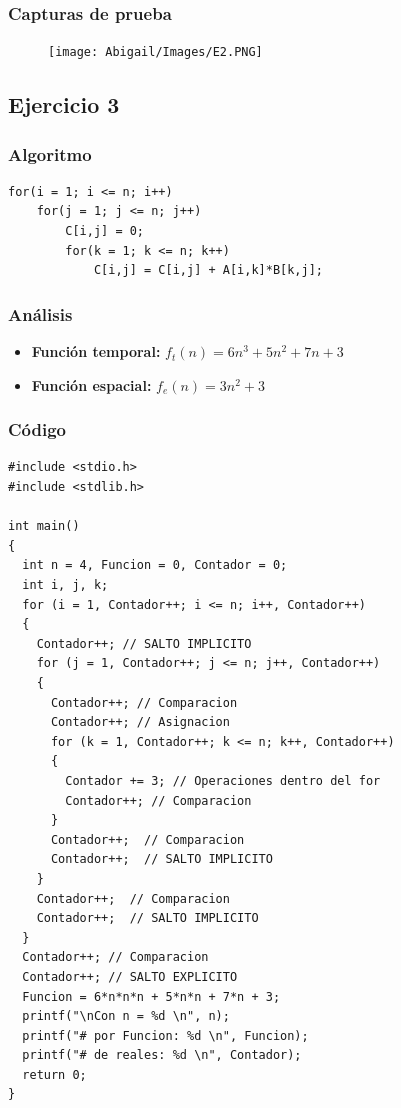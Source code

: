 \documentclass[12pt]{article}
\begin{document}
    		\subsubsection{Capturas de prueba}
				\begin{figure}[h!]
	                \centering
	                \texttt{[image: Abigail/Images/E2.PNG]}
	 		    \end{figure} 
    		

	    \subsection{Ejercicio 3}
	    	\subsubsection{Algoritmo}
	        \begin{lstlisting}[style=Java]
for(i = 1; i <= n; i++)
	for(j = 1; j <= n; j++)
		C[i,j] = 0;
		for(k = 1; k <= n; k++)
			C[i,j] = C[i,j] + A[i,k]*B[k,j]; 
    		\end{lstlisting}
    		\subsubsection{Análisis}
    			\begin{itemize}
    				\item[\Checkmark] \textbf{Función temporal:} $f_{t}(n) = 6n^{3} + 5n^{2} + 7n + 3 $
    				\item[\Checkmark] \textbf{Función espacial:} $f_{e}(n) = 3n^{2} + 3$
    			\end{itemize}
    		\subsubsection{Código}
    		\begin{lstlisting}[style=Java]
#include <stdio.h>
#include <stdlib.h>

int main() 
{
  int n = 4, Funcion = 0, Contador = 0;
  int i, j, k;
  for (i = 1, Contador++; i <= n; i++, Contador++) 
  {
    Contador++; // SALTO IMPLICITO
    for (j = 1, Contador++; j <= n; j++, Contador++) 
    {
      Contador++; // Comparacion
      Contador++; // Asignacion
      for (k = 1, Contador++; k <= n; k++, Contador++) 
      {
        Contador += 3; // Operaciones dentro del for
        Contador++; // Comparacion
      }
      Contador++;  // Comparacion
      Contador++;  // SALTO IMPLICITO
    }
    Contador++;  // Comparacion
    Contador++;  // SALTO IMPLICITO
  }
  Contador++; // Comparacion
  Contador++; // SALTO EXPLICITO
  Funcion = 6*n*n*n + 5*n*n + 7*n + 3;
  printf("\nCon n = %d \n", n); 
  printf("# por Funcion: %d \n", Funcion);
  printf("# de reales: %d \n", Contador);
  return 0;
}
	   		\end{lstlisting}
\end{document}
